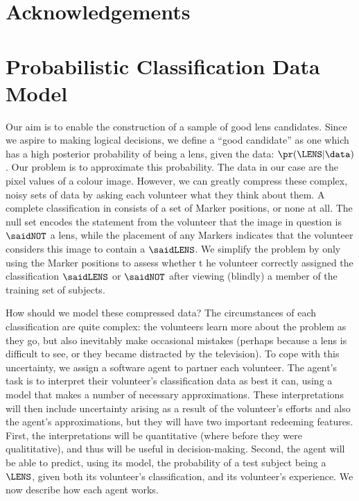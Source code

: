 \documentclass[useAMS,usenatbib,a4paper]{mn2e}
\begin{document}
\section*{Acknowledgements}
 



\appendix


\section{Probabilistic Classification Data Model}
\label{appendix:probmodel}

Our aim is to enable the construction of a sample of good lens candidates.
Since we aspire to making logical  decisions, we define a  ``good candidate''
as one which has a high posterior probability of being a lens, given the data:
$\pr(\LENS|\data)$. Our problem is to approximate this probability. The data
in our case are the pixel values of a colour image. However, we can greatly
compress these complex, noisy sets of data by asking each volunteer what they
think about them. A complete  classification in \sw consists of a set of
Marker positions, or none at all. The null set encodes the statement from
the volunteer that the image in question is $\saidNOT$ a lens, while the
placement of any  Markers indicates that the volunteer considers this image to
contain a $\saidLENS$.  We simplify the problem by only using the Marker
positions to assess whether t
he volunteer  correctly assigned the
classification $\saidLENS$ or $\saidNOT$ after viewing (blindly) a member of
the training set of subjects. 

How should we model these compressed data? The circumstances of each
classification are quite complex: the volunteers learn more about the problem
as they go, but also inevitably make occasional mistakes (perhaps because a
lens is difficult to see, or they became distracted by the television). To
cope with this uncertainty, we assign a software agent to partner each
volunteer. The agent's task is to interpret their volunteer's classification
data as best it can, using a model that makes a number of necessary
approximations. These interpretations will then include uncertainty arising as
a result of the volunteer's efforts and also the agent's approximations, but
they will have two important redeeming features. First, the interpretations
will be quantitative (where before they were qualititative),  and thus will be
useful in decision-making. Second, the agent will be able to predict, using
its model, the probability of a test subject being a $\LENS$, given both its
volunteer's classification, and its volunteer's experience. We now
describe how each agent works.
\end{document}
